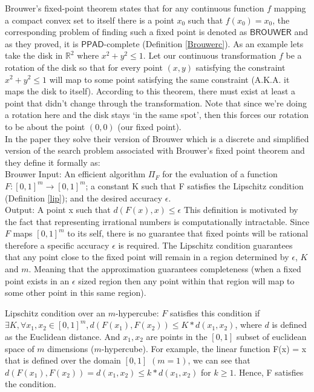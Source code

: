 \documentclass[11pt]{article}
\newcommand{\PPADc}{\mathsf{PPAD}\text{-complete}}
\begin{document}
\begin{theorem}
    \label{Brouwer}
    Brouwer's fixed-point theorem \cite{Brouwer} states that for any continuous function $f$ mapping a compact convex set to itself there is a point $x_0$ such that $f(x_0) = x_0$, the corresponding problem of finding such a fixed point is denoted as $\mathsf{BROUWER}$ \cite{PAPADIMITRIOU1994498} and as they proved, it is $\PPADc$ (Definition \ref{Brouwerc}). As an example lets take the disk in $\mathbb{R}^2$ where $x^2 + y^2 \leq 1$. Let our continuous transformation $f$ be a rotation of the disk so that for every point $(x,y)$ satisfying the constraint $x^2 + y^2 \leq 1$ will map to some point satisfying the same constraint (A.K.A. it maps the disk to itself). According to this theorem, there must exist at least a point that didn't change through the transformation. Note that since we're doing a rotation here and the disk stays `in the same spot', then this forces our rotation to be about the point $(0,0)$ (our fixed point).\\
    In the paper they solve their version of Brouwer which is a discrete and simplified version of the search problem associated with Brouwer’s fixed point theorem and they define it formally as: \\
    Brouwer Input: An  efficient  algorithm  $\Pi_F$ for  the  evaluation of a function $F: [0,1]^m \longrightarrow [0,1]^m$; a constant K such  that F satisfies the Lipschitz condition (Definition \ref{lip});  and  the  desired accuracy $\epsilon$.\\
    Output: A point x such that $d(F(x),x) \le \epsilon$
    This definition is motivated by the fact that representing irrational numbers is computationally intractable. Since $F$ maps $[0,1]^m$ to its self, there is no guarantee that fixed points will be rational therefore a specific accuracy $\epsilon$ is required. The Lipschitz condition guarantees that any point close to the fixed point will remain in a region determined by $\epsilon$, $K$ and $m$. Meaning that the approximation guarantees completeness (when a fixed point exists in an $\epsilon$ sized region then any point within that region will map to some other point in this same region). 
\end{theorem}

\begin{definition}
\label{lip}
     Lipschitz condition over an $m$-hypercube: $F$ satisfies this condition if $\exists K,\forall x_1, x_2 \in [0,1]^m, d(F(x_1),F(x_2)) \leq K*d(x_1,x_2)$, where $d$ is defined as the Euclidean distance. And $x_1,x_2$ are points in the $[0,1]$ subset of euclidean space of $m$ dimensions ($m$-hypercube). For example, the linear function F(x) = x that is defined over the domain $[0,1]$ $(m=1)$, we can see that $d(F(x_1), F(x_2)) = d(x_1,x_2) \le k * d(x_1,x_2)$ for $k \geq 1$. Hence, F satisfies the condition.\\
\end{definition}
\end{document}
